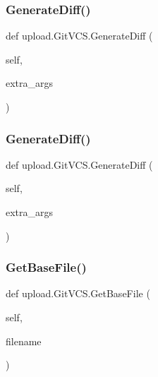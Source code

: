 \subsubsection{\texorpdfstring{Generate\+Diff()}{GenerateDiff()}\hspace{0.1cm}{\footnotesize\ttfamily [1/2]}}
{\footnotesize\ttfamily def upload.\+Git\+V\+C\+S.\+Generate\+Diff (\begin{DoxyParamCaption}\item[{}]{self,  }\item[{}]{extra\+\_\+args }\end{DoxyParamCaption})}

\mbox{\label{classupload_1_1_git_v_c_s_a3ebfc01cebc9b585706ad3f4389a8833}} 
\subsubsection{\texorpdfstring{Generate\+Diff()}{GenerateDiff()}\hspace{0.1cm}{\footnotesize\ttfamily [2/2]}}
{\footnotesize\ttfamily def upload.\+Git\+V\+C\+S.\+Generate\+Diff (\begin{DoxyParamCaption}\item[{}]{self,  }\item[{}]{extra\+\_\+args }\end{DoxyParamCaption})}

\mbox{\label{classupload_1_1_git_v_c_s_a70ddb65a6b512b8cb8cc4affa37ff9b4}} 
\subsubsection{\texorpdfstring{Get\+Base\+File()}{GetBaseFile()}\hspace{0.1cm}{\footnotesize\ttfamily [1/2]}}
{\footnotesize\ttfamily def upload.\+Git\+V\+C\+S.\+Get\+Base\+File (\begin{DoxyParamCaption}\item[{}]{self,  }\item[{}]{filename }\end{DoxyParamCaption})}


